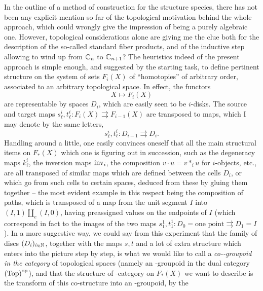 %
\label{sec:6}%
In the outline of a method of construction for the structure species,
there has not been any explicit mention so far of the topological
motivation behind the whole approach, which could wrongly give the
impression of being a purely algebraic one. However, topological
considerations alone are giving me the clue both for the description
of the so-called standard fiber products, and of the inductive step
allowing to wind up from ${\mathbb{C}}_n$ to ${\mathbb{C}}_{n+1}$? The heuristics
indeed of the present approach is simple enough, and suggested by the
starting task, to define pertinent structure on the system of sets
$F_i(X)$ of ``homotopies'' of arbitrary order, associated to an
arbitrary topological space. In effect, the functors
\[ X \mapsto F_i(X)\]
are representable by spaces $D_i$, which are easily seen to be
$i$-disks. The source and target maps $s_\ell^i, t_\ell^i :
F_i(X) \rightrightarrows F_{i-1}(X)$ are transposed to maps, which I may
denote by the same letters,
\[s_\ell^i, t_\ell^i : D_{i-1} \rightrightarrows D_i.\]
Handling around a little, one easily convinces oneself that all the
main structural items on $F_*(X)$ which one is figuring out in
succession, such as the degeneracy maps $k_\ell^i$, the inversion maps
$\operatorname{inv}_i$, the composition $v\cdot u = v *_i u$ for $i$-objects, etc.,
are all transposed of similar maps which are defined between the cells
$D_i$, or which go from such cells to certain spaces, deduced from
these by gluing them together -- the most evident example in this
respect being the composition of paths, which is transposed of a map
from the unit segment $I$ into $(I,1)\amalg_e (I,0)$, having
preassigned values on the endpoints of $I$ (which correspond in fact
to the images of the two maps $s_1^1,t_1^1 : D_0
= \text{one point} \rightrightarrows D_1 =
I$). In a more suggestive way, we could say from this
experiment that the family of discs $(D_i)_{i\in{\ensuremath{\mathbb{N}}}}$, together with
the maps $s,t$ and a lot of extra structure which enters into the
picture step by step, is what we would like to call a
\emph{co-\oo-groupoid in the category} \cTop{} of topological spaces
(namely an \oo-groupoid in the dual category ${(\mathrm{Top})}^{\mathrm{op}}$), and
that the structure of \oo-category on $F_*(X)$ we want to describe is
the transform of this co-structure into an \oo-groupoid, by the
